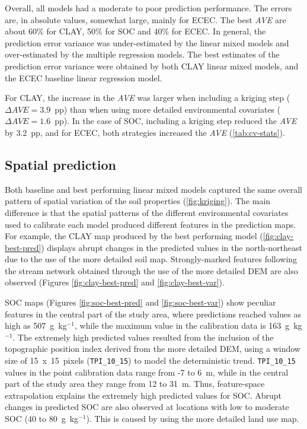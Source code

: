 

Overall, all models had a moderate to poor prediction performance. The errors 
are, in absolute values, somewhat large, mainly for ECEC. The best \textit{AVE}
are about 60\% for CLAY, 50\% for SOC and 40\% for ECEC. In general, the 
prediction error variance was under-estimated by the linear mixed models and 
over-estimated by the multiple regression models. The best estimates of the 
prediction error variance were obtained by both CLAY linear mixed models, and 
the ECEC baseline linear regression model.

For CLAY, the increase in the \textit{AVE} was larger when including a kriging
step ($\Delta\textit{AVE}=3.9$~pp) than when using more detailed environmental
covariates ($\Delta\textit{AVE}=1.6$~pp). In the case of SOC, including a 
kriging step reduced the \textit{AVE} by 3.2~pp, and for ECEC, both strategies 
increased the \textit{AVE} (\autoref{tab:cv-stats}).

\subsection{Spatial prediction}

Both baseline and best performing linear mixed models captured the same overall
pattern of spatial variation of the soil properties (\autoref{fig:kriging}). 
The main difference is that the spatial patterns of the different environmental
covariates used to calibrate each model produced different features in the 
prediction maps. For example, the CLAY map produced by the best performing 
model (\autoref{fig:clay-best-pred}) displays abrupt changes in the predicted
values in the north-northeast due to the use of the more detailed soil map. 
Strongly-marked features following the stream network obtained through the use 
of the more detailed DEM are also observed (Figures \ref{fig:clay-best-pred} 
and \ref{fig:clay-best-var}).

SOC maps (Figures \ref{fig:soc-best-pred} and \ref{fig:soc-best-var}) show 
peculiar features in the central part of the study area, where predictions 
reached values as high as 507~g~kg$^{-1}$, while the maximum value in the 
calibration data is 163~g~kg$^{-1}$. The extremely high predicted values 
resulted from the inclusion of the topographic position index derived from 
the more detailed DEM, using a window size of 15~x~15~pixels 
(\texttt{TPI\_10\_15}) to model the deterministic trend. \texttt{TPI\_10\_15} 
values in the point calibration data range from -7 to 6~m, while in the central
part of the study area they range from 12 to 31~m. Thus, feature-space 
extrapolation explains the extremely high predicted values for SOC. Abrupt 
changes in predicted SOC are also observed at locations with low to moderate 
SOC (40 to 80~g~kg$^{-1}$). This is caused by using the more detailed land use 
map.

